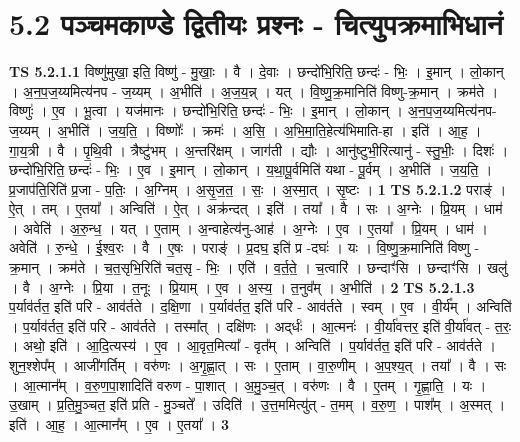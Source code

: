 \documentclass[17pt]{extarticle}
\begin{document}
\section*{ 5.2      पञ्चमकाण्डे द्वितीयः प्रश्नः - चित्युपक्रमाभिधानं }
                                \textbf{ TS 5.2.1.1} \newline
                  विष्णु॑मुखा॒ इति॒ विष्णु॑ - मु॒खाः॒ । वै । दे॒वाः । छन्दो॑भि॒रिति॒ छन्दः॑ - भिः॒ । इ॒मान् । लो॒कान् । अ॒न॒प॒ज॒य्यमित्य॑नप - ज॒य्यम् । अ॒भीति॑ । अ॒ज॒य॒न्न् । यत् । वि॒ष्णु॒क्र॒मानिति॑ विष्णु-क्र॒मान् । क्रम॑ते । विष्णुः॑ । ए॒व । भू॒त्वा । यज॑मानः । छन्दो॑भि॒रिति॒ छन्दः॑ - भिः॒ । इ॒मान् । लो॒कान् । अ॒न॒प॒ज॒य्यमित्य॑नप-ज॒य्यम् । अ॒भीति॑ । ज॒य॒ति॒ । विष्णोः᳚ । क्रमः॑ । अ॒सि॒ । अ॒भि॒मा॒ति॒हेत्य॑भिमाति-हा । इति॑ । आ॒ह॒ । गा॒य॒त्री । वै । पृ॒थि॒वी । त्रैष्टु॑भम् । अ॒न्तरि॑क्षम् । जाग॑ती । द्यौः । आनु॑ष्टुभी॒रित्यानु॑ - स्तु॒भीः॒ । दिशः॑ । छन्दो॑भि॒रिति॒ छन्दः॑ - भिः॒ । ए॒व । इ॒मान् । लो॒कान् । य॒था॒पू॒र्वमिति॑ यथा - पू॒र्वम् । अ॒भीति॑ । ज॒य॒ति॒ । प्र॒जाप॑ति॒रिति॑ प्र॒जा - प॒तिः॒ । अ॒ग्निम् । अ॒सृ॒ज॒त॒ । सः॒ । अ॒स्मा॒त् । सृ॒ष्टः । \textbf{  1} \newline
                  \newline
                                \textbf{ TS 5.2.1.2} \newline
                  पराङ्॑ । ऐ॒त् । तम् । ए॒तया᳚ । अन्विति॑ । ऐ॒त् । अक्र॑न्दत् । इति॑ । तया᳚ । वै । सः । अ॒ग्नेः । प्रि॒यम् । धाम॑ । अवेति॑ । अ॒रु॒न्ध॒ । यत् । ए॒ताम् । अ॒न्वाहेत्य॑नु-आह॑ । अ॒ग्नेः । ए॒व । ए॒तया᳚ । प्रि॒यम् । धाम॑ । अवेति॑ । रु॒न्धे॒ । ई॒श्व॒रः । वै । ए॒षः । पराङ्॑ । प्र॒दघ॒ इति॑ प्र -दघः॑ । यः । वि॒ष्णु॒क्र॒मानिति॑ विष्णु - क्र॒मान् । क्रम॑ते । च॒त॒सृभि॒रिति॑ चत॒सृ - भिः॒ । एति॑ । व॒र्त॒ते॒ । च॒त्वारि॑ । छन्दाꣳ॑सि । छन्दाꣳ॑सि । खलु॑ । वै । अ॒ग्नेः । प्रि॒या । त॒नूः । प्रि॒याम् । ए॒व । अ॒स्य॒ । त॒नुव᳚म् । अ॒भीति॑ । \textbf{  2} \newline
                  \newline
                                \textbf{ TS 5.2.1.3} \newline
                  प॒र्याव॑र्तत॒ इति॑ परि - आव॑र्तते । द॒क्षि॒णा । प॒र्याव॑र्तत॒ इति॑ परि - आव॑र्तते । स्वम् । ए॒व । वी॒र्य᳚म् । अन्विति॑ । प॒र्याव॑र्तत॒ इति॑ परि - आव॑र्तते । तस्मा᳚त् । दक्षि॑णः । अद्‌र्धः॑ । आ॒त्मनः॑ । वी॒र्या॑वत्तर॒ इति॑ वी॒र्या॑वत् - त॒रः॒ । अथो॒ इति॑ । आ॒दि॒त्यस्य॑ । ए॒व । आ॒वृत॒मित्या᳚ - वृत᳚म् । अन्विति॑ । प॒र्याव॑र्तत॒ इति॑ परि - आव॑र्तते । शुन॒श्शेप᳚म् । आजी॑गर्तिम् । वरु॑णः । अ॒गृ॒ह्णा॒त् । सः । ए॒ताम् । वा॒रु॒णीम् । अ॒प॒श्य॒त् । तया᳚ । वै । सः । आ॒त्मान᳚म् । व॒रु॒ण॒पा॒शादिति॑ वरुण - पा॒शात् । अ॒मु॒ञ्च॒त् । वरु॑णः । वै । ए॒तम् । गृ॒ह्णा॒ति॒ । यः । उ॒खाम् । प्र॒ति॒मु॒ञ्चत॒ इति॑ प्रति - मु॒ञ्चते᳚ । उदिति॑ । उ॒त्त॒ममित्यु॑त् - त॒मम् । व॒रु॒ण॒ । पाश᳚म् । अ॒स्मत् । इति॑ । आ॒ह॒ । आ॒त्मान᳚म् । ए॒व । ए॒तया᳚ । \textbf{  3} \newline
\end{document}
